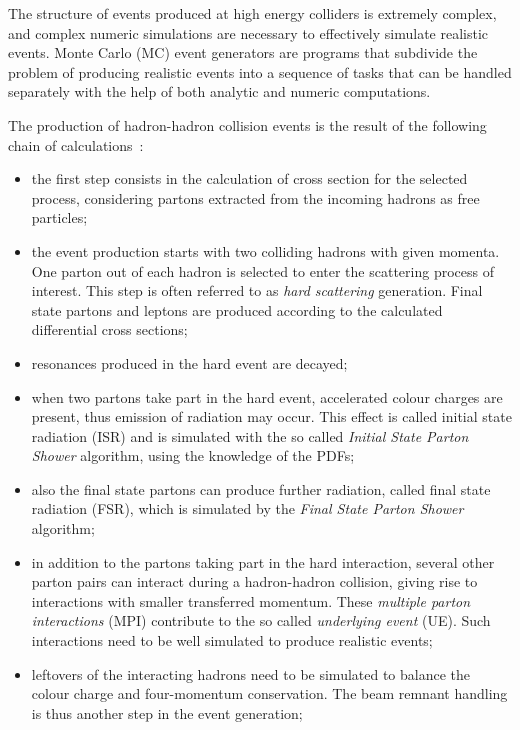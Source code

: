 The structure of events produced at high energy colliders is extremely complex, and complex numeric simulations are necessary to effectively simulate realistic events. Monte Carlo (MC) event generators are programs that subdivide the problem of producing realistic events into a sequence of tasks that can be handled separately with the help of both analytic and numeric computations.

The production of hadron-hadron collision events is the result of the following chain of calculations~\cite{Sjostrand:2016bif}:

\begin{itemize}
\item the first step consists in the calculation of cross section for the selected process, considering partons extracted from the incoming hadrons as free particles;

\item the event production starts with two colliding hadrons with given momenta. One parton out of each hadron is selected to enter the scattering process of interest. This step is often referred to as \emph{hard scattering} generation. Final state partons and leptons are produced according to the calculated differential cross sections;

\item resonances produced in the hard event are decayed;

\item when two partons take part in the hard event, accelerated colour charges are present, thus emission of radiation may occur. This effect is called initial state radiation (ISR) and is simulated with the so called \emph{Initial State Parton Shower} algorithm, using the knowledge of the PDFs;

\item also the final state partons can produce further radiation, called final state radiation (FSR), which is simulated by the \emph{Final State Parton Shower} algorithm;

\item in addition to the partons taking part in the hard interaction, several other parton pairs can interact during a hadron-hadron collision, giving rise to interactions with smaller transferred momentum. These \emph{multiple parton interactions} (MPI) contribute to the so called \emph{underlying event} (UE). Such interactions need to be well simulated to produce realistic events;

\item leftovers of the interacting hadrons need to be simulated to balance the colour charge
and four-momentum conservation. The beam remnant handling is thus another step in the event generation;


\end{itemize}
